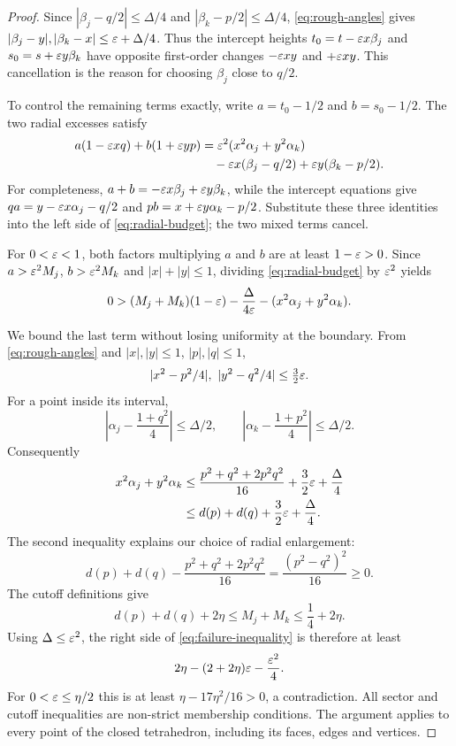 \begin{proof}
Since $|\beta_j-q/2|\le\Delta/4$ and
$|\beta_k-p/2|\le\Delta/4$, \eqref{eq:rough-angles} gives
$|\beta_j-y|,|\beta_k-x|\le\varepsilon+\Delta/4$.
Thus the intercept heights $t_0=t-\varepsilon x\beta_j$ and
$s_0=s+\varepsilon y\beta_k$ have opposite first-order changes
$-\varepsilon xy$ and $+\varepsilon xy$. This cancellation is the reason for choosing
$\beta_j$ close to $q/2$.

To control the remaining terms exactly, write $a=t_0-1/2$ and
$b=s_0-1/2$. The two radial excesses satisfy
\begin{align}
 a(1-\varepsilon xq)+b(1+\varepsilon yp)
 &=\varepsilon^2(x^2\alpha_j+y^2\alpha_k)\notag\\
 &\quad-\varepsilon x(\beta_j-q/2)+\varepsilon y(\beta_k-p/2).
 \label{eq:radial-budget}
\end{align}
For completeness, $a+b=-\varepsilon x\beta_j+\varepsilon y\beta_k$, while the
intercept equations give
$q a=y-\varepsilon x\alpha_j-q/2$ and
$p b=x+\varepsilon y\alpha_k-p/2$. Substitute these three identities into the
left side of \eqref{eq:radial-budget}; the two mixed terms cancel.

For $0<\varepsilon<1$, both factors multiplying $a$ and $b$ are at least
$1-\varepsilon>0$. Since $a>\varepsilon^2M_j$, $b>\varepsilon^2M_k$ and $|x|+|y|\le1$, dividing
\eqref{eq:radial-budget} by $\varepsilon^2$ yields
\begin{equation}\label{eq:failure-inequality}
 0>(M_j+M_k)(1-\varepsilon)-\frac{\Delta}{4\varepsilon}
                   -(x^2\alpha_j+y^2\alpha_k).
\end{equation}

We bound the last term without losing uniformity at the boundary.
From \eqref{eq:rough-angles} and $|x|,|y|\le1$, $|p|,|q|\le1$,
\[
 |x^2-p^2/4|,\ |y^2-q^2/4|\le\tfrac32\eps.
\]
For a point inside its interval,
\[
 \left|\alpha_j-\frac{1+q^2}{4}\right|\le\Delta/2,\qquad
 \left|\alpha_k-\frac{1+p^2}{4}\right|\le\Delta/2.
\]
Consequently
\begin{align*}
 x^2\alpha_j+y^2\alpha_k
 &\le\frac{p^2+q^2+2p^2q^2}{16}+\frac32\varepsilon+\frac\Delta4\\
 &\le d(p)+d(q)+\frac32\varepsilon+\frac\Delta4.
\end{align*}
The second inequality explains our choice of radial enlargement:
\[
 d(p)+d(q)-\frac{p^2+q^2+2p^2q^2}{16}
 =\frac{(p^2-q^2)^2}{16}\ge0.
\]
The cutoff definitions give
\[
 d(p)+d(q)+2\eta\le M_j+M_k\le\frac14+2\eta.
\]
Using $\Delta\le\varepsilon^2$, the right side of \eqref{eq:failure-inequality} is therefore at least
\begin{equation}\label{eq:uniform-coverage-gap}
 2\eta-(2+2\eta)\varepsilon-\frac{\varepsilon^2}{4}.
\end{equation}
For $0<\varepsilon\le\eta/2$ this is at least
$\eta-17\eta^2/16>0$, a contradiction.
All sector and cutoff inequalities are non-strict membership conditions. The argument applies to every point of the closed tetrahedron, including its faces, edges and vertices.
\end{proof}


